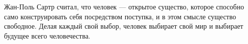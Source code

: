 
Жан-Поль Сартр считал, что человек --- открытое существо, которое способно само конструировать себя посредством поступка, и в этом смысле существо свободное. Делая каждый свой выбор, человек выбирает свой мир и выбирает будущее всего человечества.

